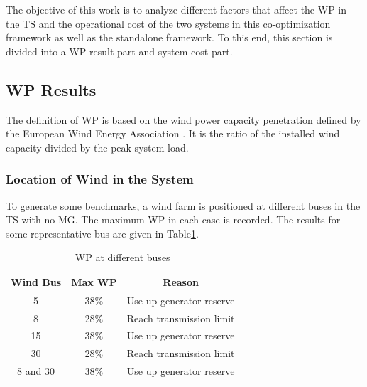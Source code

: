 
The objective of this work is to analyze different factors that affect the WP in the TS and the operational cost of the two systems in this co-optimization framework as well as the standalone framework. To this end, this section is divided into a WP result part and system cost part.
\subsection{WP Results}

The definition of WP is based on the wind power capacity penetration defined by the European Wind Energy Association \cite{european2012wind}. It is the ratio of the installed wind capacity divided by the peak system load.

\subsubsection{Location of Wind in the System}
To generate some benchmarks, a wind farm is positioned at different buses in the TS with no MG. The maximum WP in each case is recorded. The results for some representative bus are given in Table\ref{transbus}.

\begin{table}[H]
\centering
\begin{tabular}{ |c|c|c| } 
 \hline
 Wind Bus & Max WP & Reason \\ 
 \hline
5 & 38\% & Use up generator reserve \\ 
 \hline
8 & 28\% & Reach transmission limit\\ 
 \hline
15 & 38\% & Use up generator reserve \\ 
 \hline
30 & 28\% & Reach transmission limit \\ 
 \hline
8 and 30 & 38\% & Use up generator reserve \\ 
 \hline
\end{tabular}
\caption{ WP at different buses}
 \label{transbus}
\end{table}

